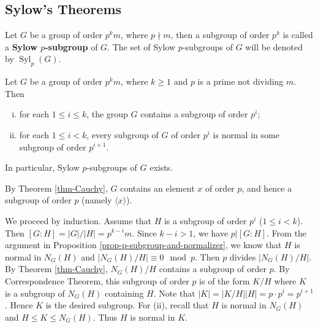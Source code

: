 \subsection{Sylow's Theorems}
\begin{definition}
Let $G$ be a group of order $p^k m$, where $p\nmid m$, then a subgroup of order $p^k$ is called a \textbf{Sylow $p$-subgroup} of $G$. The set of Sylow $p$-subgroups of $G$ will be denoted by $\operatorname{Syl}_p(G)$.
\end{definition}
\begin{theorem} \label{thm-first-Sylow-theorem}
	Let $G$ be a group of order $p^km$, where $k\geq 1$ and $p$ is a prime not dividing $m$. Then 
	\begin{enumerate}[(i)]
		\item for each $1\leq i\leq k$, the group $G$ contains a subgroup of order $p^i$;
		\item for each $1\leq i<k$, every subgroup of $G$ of order $p^i$ is normal in some subgroup of order $p^{i+1}$.
	\end{enumerate} In particular, Sylow $p$-subgroups of $G$ exists. 
\end{theorem}
\begin{sketch}
	By Theorem \ref{thm-Cauchy}, $G$ contains an element $x$ of order $p$, and hence a subgroup of order $p$ (namely $\langle x \rangle$). 
	
	We proceed by induction. Assume that $H$ is a subgroup of order $p^i$ ($1\leq i<k$). Then $[G:H] = |G|/|H| = p^{k-i}m$. Since $k-i>1$, we have $p|[G:H]$. From the argument in Proposition \ref{prop-p-subgroup-and-normalizer}, we know that $H$ is normal in $N_G(H)$ and $|N_G(H)/H|\equiv 0\mod p$. Then $p$ divides $|N_G(H)/H|$. By Theorem \ref{thm-Cauchy}, $N_G(H)/H$ contains a subgroup of order $p$. By Correspondence Theorem, this subgroup of order $p$ is of the form $K/H$ where $K$ is a subgroup of $N_G(H)$ containing $H$. Note that $|K| = |K/H||H| = p\cdot p^i = p^{i+1}$. Hence $K$ is the desired subgroup. For (ii), recall that $H$ is normal in $N_G(H)$ and $H\leq K\leq N_G(H)$. Thus $H$ is normal in $K$.
\end{sketch}

